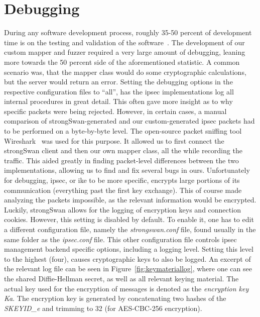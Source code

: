\section{Debugging}
During any software development process, roughly 35-50 percent of development time is on the testing and validation of the software~\cite{britton2013reversible}. The development of our custom mapper and fuzzer required a very large amount of debugging, leaning more towards the 50 percent side of the aforementioned statistic. A common scenario was, that the mapper class would do some cryptographic calculations, but the server would return an error. Setting the debugging options in the respective configuration files to ``all'', has the \ac{ipsec} implementations log all internal procedures in great detail. This often gave more insight as to why specific packets were being rejected. However, in certain cases, a manual comparison of strongSwan-generated and our custom-generated \ac{ipsec} packets had to be performed on a byte-by-byte level. The open-source packet sniffing tool Wireshark~\cite{doc:wireshark} was used for this purpose. It allowed us to first connect the strongSwan client and then our own mapper class, all the while recording the traffic. This aided greatly in finding packet-level differences between the two implementations, allowing us to find and fix several bugs in ours. Unfortunately for debugging, \ac{ipsec}, or \ac{ike} to be more specific, encrypts large portions of its communication (everything past the first key exchange). This of course made analyzing the packets impossible, as the relevant information would be encrypted. Luckily, strongSwan allows for the logging of encryption keys and connection cookies. However, this setting is disabled by default. To enable it, one has to edit a different configuration file, namely the \emph{strongswan.conf} file, found usually in the same folder as the \emph{ipsec.conf} file. This other configuration file controls \ac{ipsec} management backend specific options, including a logging level. Setting this level to the highest (four), causes cryptographic keys to also be logged. An excerpt of the relevant log file can be seen in Figure~\ref{fig:keymateriallog}, where one can see the shared Diffie-Hellman secret, as well as all relevant keying material. The actual key used for the encryption of messages is denoted as the \emph{encryption key Ka}. The encryption key is generated by concatenating two hashes of the \emph{SKEYID\_e} and trimming to \SI{32}{\byte} (for AES-CBC-256 encryption). 

